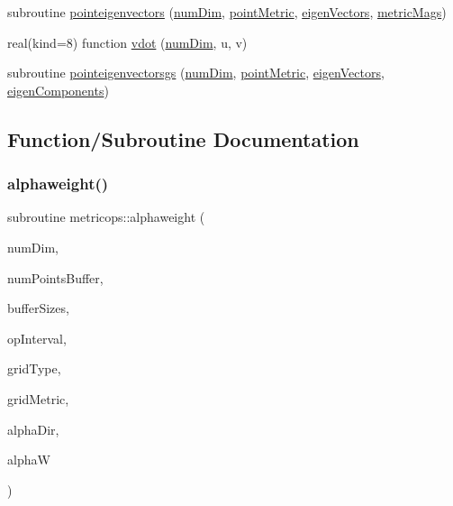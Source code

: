 \begin{DoxyCompactItemize}
\item 
subroutine \hyperlink{namespacemetricops_af7524e334ad2b738e5ecd980dbc92041}{pointeigenvectors} (\hyperlink{SATKernels_8H_a680185db8546de161968dabace9e94f1}{num\+Dim}, \hyperlink{RoeKernels_8H_a3ef779535ff22c94cec7a43794047e9d}{point\+Metric}, \hyperlink{MetricKernels_8H_afb43d750e3a6b4c1549a9589c0f2a7d6}{eigen\+Vectors}, \hyperlink{MetricKernels_8H_aba6c9360151f4fd828af1b31d0fe65b3}{metric\+Mags})
\item 
real(kind=8) function \hyperlink{namespacemetricops_a2ad1b3b390a1df3e16e258eb2bf0d37a}{vdot} (\hyperlink{SATKernels_8H_a680185db8546de161968dabace9e94f1}{num\+Dim}, u, v)
\item 
subroutine \hyperlink{namespacemetricops_a6cac925729827357652e938b64681663}{pointeigenvectorsgs} (\hyperlink{SATKernels_8H_a680185db8546de161968dabace9e94f1}{num\+Dim}, \hyperlink{RoeKernels_8H_a3ef779535ff22c94cec7a43794047e9d}{point\+Metric}, \hyperlink{MetricKernels_8H_afb43d750e3a6b4c1549a9589c0f2a7d6}{eigen\+Vectors}, \hyperlink{MetricKernels_8H_ad7c998cbde26ccedfe008bbb660d59fe}{eigen\+Components})
\end{DoxyCompactItemize}


\subsection{Function/\+Subroutine Documentation}
\hypertarget{namespacemetricops_ac9382d1e722d0417169f5a2f160ebfc7}{}\label{namespacemetricops_ac9382d1e722d0417169f5a2f160ebfc7} 
\subsubsection{\texorpdfstring{alphaweight()}{alphaweight()}}
{\footnotesize\ttfamily subroutine metricops\+::alphaweight (\begin{DoxyParamCaption}\item[{integer(kind=4), intent(in)}]{num\+Dim,  }\item[{integer(kind=8), intent(in)}]{num\+Points\+Buffer,  }\item[{integer(kind=8), dimension(numdim), intent(in)}]{buffer\+Sizes,  }\item[{integer(kind=8), dimension(2$\ast$numdim), intent(in)}]{op\+Interval,  }\item[{integer(kind=4), intent(in)}]{grid\+Type,  }\item[{real(kind=8), dimension(numdim$\ast$numdim$\ast$numpointsbuffer), intent(in), target}]{grid\+Metric,  }\item[{integer(kind=4), intent(in)}]{alpha\+Dir,  }\item[{real(kind=8), dimension(numpointsbuffer), intent(out)}]{alphaW }\end{DoxyParamCaption})}



